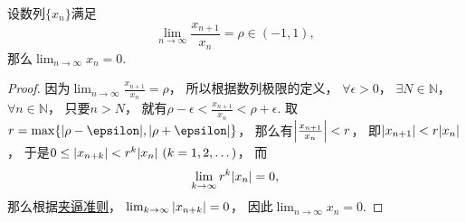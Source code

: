 \begin{proposition}
设数列\(\{x_n\}\)满足\[
	\lim_{n\to\infty} \frac{x_{n+1}}{x_n} = \rho \in (-1,1),
\]
那么\(\lim_{n\to\infty} x_n = 0\).
\begin{proof}
因为\(\lim_{n\to\infty} \frac{x_{n+1}}{x_n} = \rho\)，
所以根据数列极限的定义，
\(\forall\epsilon>0\)，
\(\exists N\in\mathbb{N}\)，
\(\forall n\in\mathbb{N}\)，
只要\(n > N\)，
就有\(\rho-\epsilon < \frac{x_{n+1}}{x_n} < \rho+\epsilon\).
取\(r=\max\{\abs{\rho-\epsilon},\abs{\rho+\epsilon}\}\)，
那么有\(\abs{\frac{x_{n+1}}{x_n}} < r\)，
即\(\abs{x_{n+1}} < r \abs{x_n}\)，
于是\(0 \leq \abs{x_{n+k}} < r^k \abs{x_n}\ (k=1,2,\dotsc)\)，
而\[
	\lim_{k\to\infty} r^k \abs{x_n} = 0,
\]
那么根据\hyperref[theorem:极限.夹逼准则]{夹逼准则}，
\(\lim_{k\to\infty} \abs{x_{n+k}} = 0\)，
因此\(\lim_{n\to\infty} x_n = 0\).
\end{proof}
\end{proposition}
